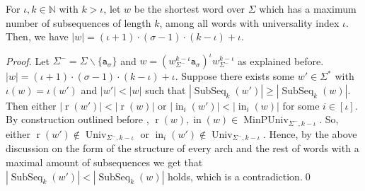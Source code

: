 \documentclass[runningheads,UKenglish,cleveref, autoref, thm-restate]{llncs}
\newcommand{\N}{\mathbb{N}}
\def\ta{\mathtt{a}}
\def\r{\operatorname{r}}
\DeclareMathOperator\ScatFact{SubSeq}
\DeclareMathOperator{\MinPerfUniv}{MinPUniv}
\DeclareMathOperator{\Univ}{Univ}
\DeclareMathOperator{\inner}{in}
\newif\ifpaper
\begin{document}
\begin{proposition}\label{corollary:min-absent-shortest-word-length-tight}
    For $\iota, k\in\N$ with $k > \iota$, let $w$ be the shortest word over $\Sigma$ which has a maximum number of subsequences of length $k$, among all words with universality index $\iota$.
    Then, we have $ |w| = (\iota+1)\cdot(\sigma -1)\cdot(k-\iota) + \iota.$
\end{proposition}
\ifpaper
\begin{proof}
	Let $\Sigma^-=\Sigma\backslash\{\ta_{\sigma}\}$ and $w = (w_{\Sigma^-}^{k-\iota} \ta_\sigma)^{\iota}w_{\Sigma^-}^{k-\iota}$ as explained before.%
	$|w| = (\iota+1)\cdot(\sigma -1)\cdot(k-\iota) + \iota$. 
	Suppose there exists some $w'\in\Sigma^*$ with $\iota(w) = \iota(w')$
	and $|w'| < |w|$ such that $|\ScatFact_k(w')| \geq |\ScatFact_k(w)|$.
	Then either $|\r(w')| < |\r(w)|$ or $|\inner_i(w')| < |\inner_i(w)|$ for some $i\in[\iota]$.
	By construction outlined before %
	, $\r(w),\inner(w)\in\MinPerfUniv_{\Sigma^-,k-\iota}$. So, either $\r(w')\notin\Univ_{\Sigma^-,k-\iota}$ or
	$\inner_i(w')\notin\Univ_{\Sigma^-,k-\iota}$. Hence, by the above discussion on the form of the structure of every arch and the rest of words with a maximal amount of subsequences %
	we get that $|\ScatFact_k(w')| < |\ScatFact_k(w)|$ holds, which is a contradiction.\qed
\end{proof}
\else
\begin{proof}
	Let $\Sigma^-=\Sigma\backslash\{\ta_{\sigma}\}$ and $w = (w_{\Sigma^-}^{k-\iota} \ta_\sigma)^{\iota}w_{\Sigma^-}^{k-\iota}$ as explained before.%
	$|w| = (\iota+1)\cdot(\sigma -1)\cdot(k-\iota) + \iota$. 
	Suppose there exists some $w'\in\Sigma^*$ with $\iota(w) = \iota(w')$
	and $|w'| < |w|$ such that $|\ScatFact_k(w')| \geq |\ScatFact_k(w)|$.
	Then either $|\r(w')| < |\r(w)|$ or $|\inner_i(w')| < |\inner_i(w)|$ for some $i\in[\iota]$.
	By construction outlined before %
	, $\r(w),\inner(w)\in\MinPerfUniv_{\Sigma^-,k-\iota}$. So, either $\r(w')\notin\Univ_{\Sigma^-,k-\iota}$ or
	$\inner_i(w')\notin\Univ_{\Sigma^-,k-\iota}$. Hence, by the above discussion on the form of the structure of every arch and the rest of words with a maximal amount of subsequences %
	we get that $|\ScatFact_k(w')| < |\ScatFact_k(w)|$ holds, which is a contradiction.\qed
\end{proof}
\fi
\end{document}
